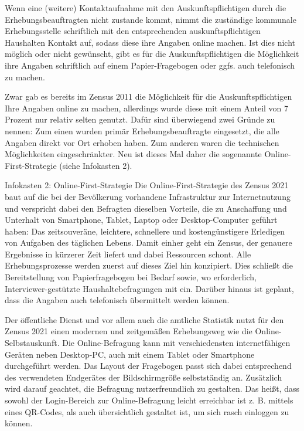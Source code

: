Wenn eine (weitere) Kontaktaufnahme mit den Auskunftspflichtigen durch die Erhebungsbeauftragten nicht zustande kommt, nimmt die zuständige kommunale Erhebungsstelle schriftlich mit den entsprechenden auskunftspflichtigen Haushalten Kontakt auf, sodass diese ihre Angaben online machen. Ist dies nicht möglich oder nicht gewünscht, gibt es für die Auskunftspflichtigen die Möglichkeit ihre Angaben schriftlich auf einem Papier-Fragebogen oder ggfs. auch telefonisch zu machen.

Zwar gab es bereits im Zensus 2011 die Möglichkeit für die Auskunftspflichtigen Ihre Angaben online zu machen, allerdings wurde diese mit einem Anteil von 7 Prozent nur relativ selten genutzt. Dafür sind überwiegend zwei Gründe zu nennen: Zum einen wurden primär Erhebungsbeauftragte eingesetzt, die alle Angaben direkt vor Ort erhoben haben. Zum anderen waren die technischen Möglichkeiten eingeschränkter. Neu ist dieses Mal daher die sogenannte Online-First-Strategie (siehe Infokasten 2).

\begin{myblock}{Infokasten 2: Online-First-Strategie}
Die Online-First-Strategie des Zensus 2021 baut auf die bei der Bevölkerung vorhandene Infrastruktur zur Internetnutzung und verspricht dabei den Befragten dieselben Vorteile, die zu Anschaffung und Unterhalt von Smartphone, Tablet, Laptop oder Desktop-Computer geführt haben: Das zeitsouveräne, leichtere, schnellere und kostengünstigere Erledigen von Aufgaben des täglichen Lebens. Damit einher geht ein Zensus, der genauere Ergebnisse in kürzerer Zeit liefert und dabei Ressourcen schont. Alle Erhebungsprozesse werden zuerst auf dieses Ziel hin konzipiert. Dies schließt die Bereitstellung von Papierfragebogen bei Bedarf sowie, wo erforderlich, Interviewer-gestützte Haushaltebefragungen mit ein. Darüber hinaus ist geplant, dass die Angaben auch telefonisch übermittelt werden können.
\end{myblock}

Der öffentliche Dienst und vor allem auch die amtliche Statistik nutzt für den Zensus 2021 einen modernen und zeitgemäßen Erhebungsweg wie die Online-Selbstauskunft. Die Online-Befragung kann mit verschiedensten internetfähigen Geräten neben Desktop-PC, auch mit einem Tablet oder Smartphone durchgeführt werden. Das Layout der Fragebogen passt sich dabei entsprechend des verwendeten Endgerätes der Bildschirmgröße selbstständig an. Zusätzlich wird darauf geachtet, die Befragung nutzerfreundlich zu gestalten. Das heißt, dass sowohl der Login-Bereich zur Online-Befragung leicht erreichbar ist z. B. mittels eines QR-Codes, als auch übersichtlich gestaltet ist, um sich rasch einloggen zu können.\par

